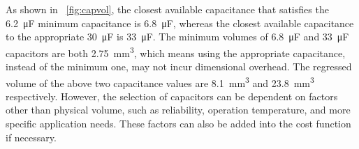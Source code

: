 As shown in \figurename{~\ref{fig:capvol}}, the closest available capacitance that satisfies the \SI{6.2}{\micro\farad} minimum capacitance is \SI{6.8}{\micro\farad}, whereas the closest available capacitance to the appropriate \SI{30}{\micro\farad} is \SI{33}{\micro\farad}. The minimum volumes of \SI{6.8}{\micro\farad} and \SI{33}{\micro\farad} capacitors are both \SI{2.75}{\cubic\milli\meter}, which means using the appropriate capacitance, instead of the minimum one, may not incur dimensional overhead. 
The regressed volume of the above two capacitance values are \SI{8.1}{\cubic\milli\meter} and \SI{23.8}{\cubic\milli\meter} respectively. However, the selection of capacitors can be dependent on factors other than physical volume, such as reliability, operation temperature, and more specific application needs. These factors can also be added into the cost function if necessary. 

